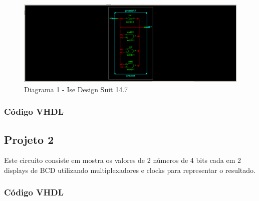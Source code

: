 \documentclass[12pts]{article}
\begin{document}
\begin{figure}[!htb]
  \centering
  \includegraphics[scale=0.3	]{imagens/esquematico1}
  \caption{Diagrama 1 - Ise Design Suit 14.7}
  \label{figRotulo}
\end{figure}

\subsubsection{Código VHDL}
%

\pagebreak

\subsection{Projeto 2}

Este circuito consiste em mostra os valores de 2 números de 4 bits cada em 2 displays de BCD utilizando multiplexadores e clocks para representar o resultado.

\subsubsection{Código VHDL}

\end{document}
